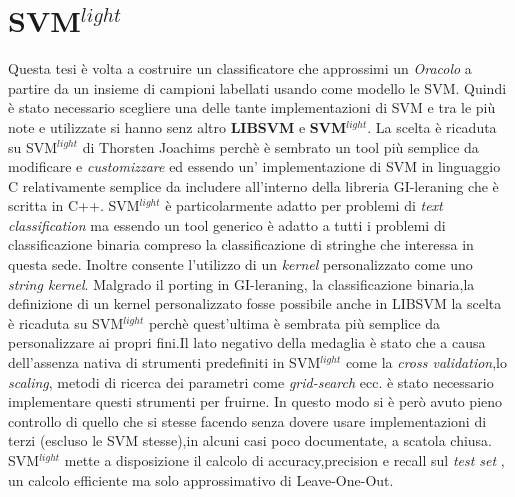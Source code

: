  \section{SVM$^{light}$}
 Questa tesi è volta a costruire un classificatore che approssimi un \textit{Oracolo} a partire da un insieme di campioni labellati usando come modello le \ac{SVM}. Quindi è stato necessario scegliere una delle tante implementazioni di \ac{SVM} e tra le più note e utilizzate si hanno senz altro \textbf{LIBSVM} e \textbf{SVM$^{light}$}. La scelta è ricaduta su SVM$^{light}$   di Thorsten Joachims perchè è sembrato un tool più semplice da modificare e \textit{customizzare} ed essendo un' implementazione di \ac{SVM} in linguaggio C relativamente semplice da includere all'interno della libreria GI-leraning che è scritta in C++. SVM$^{light}$ è particolarmente adatto per problemi di \textit{text classification} ma essendo un tool generico è adatto a tutti i problemi di classificazione binaria compreso la classificazione di stringhe che interessa in questa sede. Inoltre consente l'utilizzo di un \textit{kernel} personalizzato come uno \textit{string kernel}. Malgrado il porting in GI-leraning, la classificazione binaria,la definizione di un kernel personalizzato fosse possibile anche in LIBSVM la scelta è ricaduta su  SVM$^{light}$ perchè quest'ultima è sembrata più semplice da personalizzare ai propri fini.Il lato negativo della medaglia è stato che a causa dell'assenza nativa  di strumenti predefiniti in SVM$^{light}$ come la \textit{cross validation},lo \textit{scaling}, metodi di ricerca dei parametri come \textit{grid-search} ecc. è stato necessario implementare questi strumenti per fruirne. In questo modo si è però avuto pieno controllo di quello che si stesse facendo senza dovere usare implementazioni di terzi (escluso le \ac{SVM} stesse),in alcuni casi poco documentate, a scatola chiusa. SVM$^{light}$ mette a disposizione il calcolo di accuracy,precision e recall sul \textit{test set} , un calcolo efficiente ma solo approssimativo di Leave-One-Out.
 
